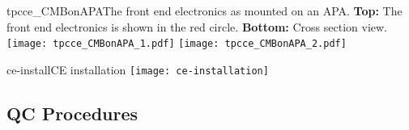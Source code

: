 \begin{cdrfigure}{tpcce_CMBonAPA}{The front end electronics as mounted on an APA.
  {\bf Top:} The front end electronics  is shown in the red circle.
  {\bf Bottom:} Cross section view.}
\texttt{[image: tpcce\_CMBonAPA\_1.pdf]}
\texttt{[image: tpcce\_CMBonAPA\_2.pdf]}
\end{cdrfigure}



\begin{cdrfigure}[CE installation]{ce-install}{CE installation}
\texttt{[image: ce-installation]}
\end{cdrfigure}


\subsection{QC Procedures}

